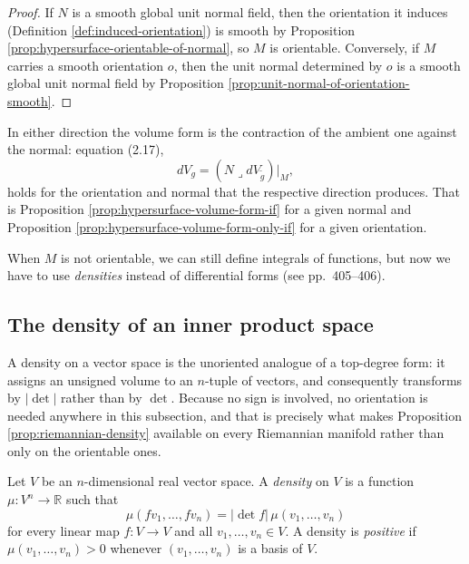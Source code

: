 \begin{proof}
\leanok
{}
If $N$ is a smooth global unit normal field, then the orientation it induces (Definition
\ref{def:induced-orientation}) is smooth by Proposition
\ref{prop:hypersurface-orientable-of-normal}, so $M$ is orientable. Conversely, if $M$ carries a
smooth orientation $o$, then the unit normal determined by $o$ is a smooth global unit normal
field by Proposition \ref{prop:unit-normal-of-orientation-smooth}.
\end{proof}

In either direction the volume form is the contraction of the ambient one against the normal:
equation (2.17),
\[
  dV_g = (N \lrcorner dV_{\tilde g})|_M ,
\]
holds for the orientation and normal that the respective direction produces. That is
Proposition \ref{prop:hypersurface-volume-form-if} for a given normal and Proposition
\ref{prop:hypersurface-volume-form-only-if} for a given orientation.

When $M$ is not orientable, we can still define integrals of functions, but now we have to use \emph{densities} instead of differential forms (see pp.~405--406).

\subsection{The density of an inner product space}

A density on a vector space is the unoriented analogue of a top-degree form: it assigns an
unsigned volume to an $n$-tuple of vectors, and consequently transforms by $|\det|$ rather than
by $\det$. Because no sign is involved, no orientation is needed anywhere in this subsection,
and that is precisely what makes Proposition \ref{prop:riemannian-density} available on every
Riemannian manifold rather than only on the orientable ones.

\begin{definition}
\label{def:density-vector-space}
\leanok
Let $V$ be an $n$-dimensional real vector space. A \emph{density} on $V$ is a function
$\mu : V^n \to \mathbb{R}$ such that
\begin{equation}
\mu(f v_1, \ldots, f v_n) = |\det f| \, \mu(v_1, \ldots, v_n)
\tag{B.14}
\end{equation}
for every linear map $f : V \to V$ and all $v_1, \ldots, v_n \in V$. A density is
\emph{positive} if $\mu(v_1, \ldots, v_n) > 0$ whenever $(v_1, \ldots, v_n)$ is a basis of $V$.
\end{definition}

